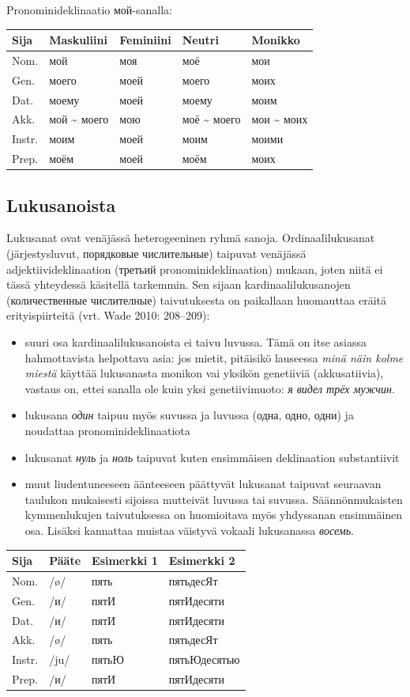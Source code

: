 \documentclass[]{scrartcl}
\providecommand{\tightlist}{%
  \setlength{\itemsep}{0pt}\setlength{\parskip}{0pt}}
\begin{document}
Pronominideklinaatio мой-sanalla:

\begin{longtable}[c]{@{}lllll@{}}
\toprule
Sija & Maskuliini & Feminiini & Neutri & Monikko\tabularnewline
\midrule
\endhead
Nom. & мой & моя & моё & мои\tabularnewline
Gen. & моего & моей & моего & моих\tabularnewline
Dat. & моему & моей & моему & моим\tabularnewline
Akk. & мой \textasciitilde{} моего & мою & моё \textasciitilde{} моего &
мои \textasciitilde{} моих\tabularnewline
Instr. & моим & моей & моим & моими\tabularnewline
Prep. & моём & моей & моём & моих\tabularnewline
\bottomrule
\end{longtable}

\subsection{Lukusanoista}\label{lukusanoista}

Lukusanat ovat venäjässä heterogeeninen ryhmä sanoja. Ordinaalilukusanat
(järjestysluvut, порядковые числительные) taipuvat venäjässä
adjektiivideklinaation (третьий pronominideklinaation) mukaan, joten
niitä ei tässä yhteydessä käsitellä tarkemmin. Sen sijaan
kardinaalilukusanojen (количественные числителные) taivutuksesta on
paikallaan huomauttaa eräitä erityispiirteitä (vrt. Wade 2010:
208--209):

\begin{itemize}
\tightlist
\item
  suuri osa kardinaalilukusanoista ei taivu luvussa. Tämä on itse
  asiassa hahmottavista helpottava asia: jos mietit, pitäisikö lauseessa
  \emph{minä näin kolme miestä} käyttää lukusanasta monikon vai yksikön
  genetiiviä (akkusatiivia), vastaus on, ettei sanalla ole kuin yksi
  genetiivimuoto: \emph{я видел трёх мужчин}.
\item
  lukusana \emph{один} taipuu myös suvussa ja luvussa (одна, одно, одни)
  ja noudattaa pronominideklinaatiota
\item
  lukusanat \emph{нуль} ja \emph{ноль} taipuvat kuten ensimmäisen
  deklinaation substantiivit
\item
  muut liudentuneeseen äänteeseen päättyvät lukusanat taipuvat seuraavan
  taulukon mukaisesti sijoissa mutteivät luvussa tai suvussa.
  Säännönmukaisten kymmenlukujen taivutuksessa on huomioitava myös
  yhdyssanan ensimmäinen osa. Lisäksi kannattaa muistaa väistyvä vokaali
  lukusanassa \emph{восемь}.
\end{itemize}

\begin{longtable}[c]{@{}llll@{}}
\toprule
Sija & Pääte & Esimerkki 1 & Esimerkki 2\tabularnewline
\midrule
\endhead
Nom. & /ø/ & пять & пятьдесЯт\tabularnewline
Gen. & /и/ & пятИ & пятИдесяти\tabularnewline
Dat. & /и/ & пятИ & пятИдесяти\tabularnewline
Akk. & /ø/ & пять & пятьдесЯт\tabularnewline
Instr. & /ju/ & пятьЮ & пятьЮдесятью\tabularnewline
Prep. & /и/ & пятИ & пятИдесяти\tabularnewline
\bottomrule
\end{longtable}
\end{document}
